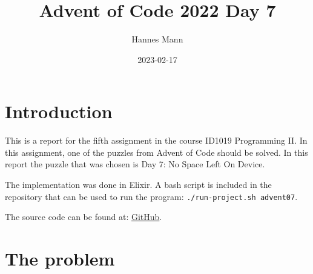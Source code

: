 \documentclass[a4paper,11pt]{article}
\begin{document}
\title{
    \textbf{Advent of Code 2022 Day 7}
}
\author{Hannes Mann}
\date{2023-02-17}

\maketitle

\section*{Introduction}

This is a report for the fifth assignment in the course ID1019 Programming II.
In this assignment, one of the puzzles from Advent of Code should be solved. In this report the puzzle that was chosen is Day 7: No Space Left On Device.

The implementation was done in Elixir. A bash script is included in the repository that can be used to run the program: \texttt{./run-project.sh advent07}.

The source code can be found at: \href{https://github.com/hannesmann/ID1019/tree/main/src/advent07}{GitHub}.

\section*{The problem}
\end{document}

